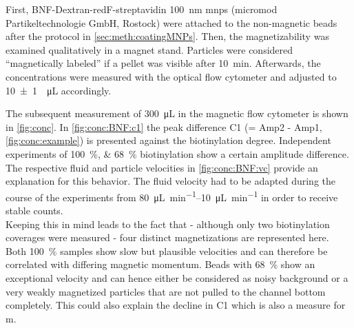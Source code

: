 First, BNF-Dextran-redF-streptavidin \SI{100}{\nano\meter} \glspl{mnp} (micromod Partikeltechnologie GmbH, Rostock) were attached to the non-magnetic beads after the protocol in \cref{sec:meth:coatingMNPs}. Then, the magnetizability was examined qualitatively in a magnet stand. Particles were considered ``magnetically labeled'' if a pellet was visible after \SI{10}{\minute}. Afterwards, the concentrations were measured with the optical flow cytometer and adjusted to \SI{10 +- 1}{\per\micro\liter} accordingly.

The subsequent measurement of \SI{300}{\micro\liter} in the magnetic flow cytometer is shown in \cref{fig:conc}. In \cref{fig:conc:BNF:c1} the peak difference C1 (= Amp2 - Amp1, \cref{fig:conc:example}) is presented against the biotinylation degree. Independent experiments of \SIlist{100;68}{\percent} biotinylation show a certain amplitude difference. The respective fluid and particle velocities in \cref{fig:conc:BNF:vc} provide an explanation for this behavior. The fluid velocity had to be adapted during the course of the experiments from \SIrange{80}{10}{\micro\liter\per\minute} in order to receive stable counts.\\
Keeping this in mind leads to the fact that - although only two biotinylation coverages were measured - four distinct magnetizations are represented here. Both \SI{100}{\percent} samples show slow but plausible velocities and can therefore be correlated with differing magnetic momentum. Beads with \SI{68}{\percent} show an exceptional velocity and can hence either be considered as noisy background or a very weakly magnetized particles that are not pulled to the channel bottom completely. This could also explain the decline in C1 which is also a measure for \acrlong{m}.

